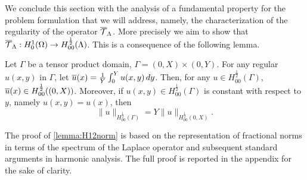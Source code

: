 \documentclass[r]{siamart171218}
\begin{document}
We conclude this section with the analysis of a fundamental property for the problem formulation that we will address, namely, the characterization of the regularity of the operator ${\overline{\mathcal{T}}_\Lambda}$. More precisely we aim to show that ${\overline{\mathcal{T}}_\Lambda}: H^1_0(\Omega) \rightarrow H^\frac 1 2_{00}(\Lambda)$.
This is a consequence of the following lemma.

\begin{lemma}\label{lemma:H12norm}
Let $\Gamma$ be a tensor product domain, $\Gamma= (0,X) \times (0,Y)$. For any regular $u(x,y)$ in $\Gamma$, let $\overline{u}(x)=\frac 1Y \int _0^Y u(x,y)\, dy$. Then, for any $u\in H_{00}^{\frac 12}(\Gamma)$, $\overline{u}(x)\in H_{00}^{\frac 12}((0,X))$. 
Moreover, if $u(x,y)\in H^{\frac 12}_{00}(\Gamma)$ is constant with respect to $y$, namely $u(x,y)=u(x)$, then 
\begin{equation*}
\|u\|_{H^{\frac 12}_{00}(\Gamma)}=Y \|u\|_{H^{\frac 12}_{00}(0,X)}.
\end{equation*}
\end{lemma}
The proof of \ref{lemma:H12norm} is based on the representation of fractional norms in terms of the spectrum of the Laplace operator and subsequent standard arguments in harmonic analysis. The full proof is reported in the appendix for the sake of clarity.



\end{document}
